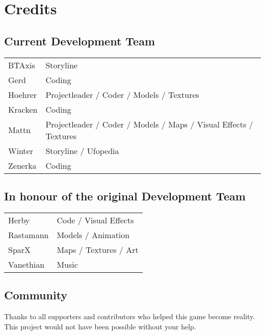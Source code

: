 \section{Credits}

\subsection{Current Development Team}
\begin{tabular}{l | l}
BTAxis & Storyline \\
Gerd & Coding \\
Hoehrer & Projectleader / Coder / Models / Textures \\
Kracken & Coding \\
Mattn & Projectleader / Coder / Models / Maps / Visual Effects / Textures \\
Winter & Storyline / Ufopedia \\
Zenerka & Coding
\end{tabular}

\subsection{In honour of the original Development Team}
\begin{tabular}{l | l}
Herby & Code / Visual Effects\\
Rastamann & Models / Animation\\
SparX & Maps / Textures / Art\\
Vanethian & Music\\
\end{tabular}

\subsection{Community}
Thanks to all supporters and contributors who helped this game become reality. This project would not have been possible without your help.
